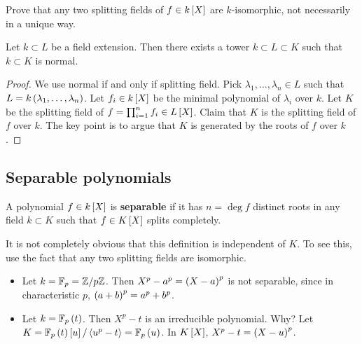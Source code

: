 \begin{exercise*}
Prove that any two splitting fields of $ f \in k\sbr{X} $ are $ k $-isomorphic, not necessarily in a unique way.
\end{exercise*}


\begin{proposition}
Let $ k \subset L $ be a field extension. Then there exists a tower $ k \subset L \subset K $ such that $ k \subset K $ is normal.
\end{proposition}

\begin{proof}
We use normal if and only if splitting field. Pick $ \lambda_1, \dots, \lambda_n \in L $ such that $ L = k\br{\lambda_1, \dots, \lambda_n} $. Let $ f_i \in k\sbr{X} $ be the minimal polynomial of $ \lambda_i $ over $ k $. Let $ K $ be the splitting field of $ f = \prod_{i = 1}^n f_i \in L\sbr{X} $. Claim that $ K $ is the splitting field of $ f $ over $ k $. The key point is to argue that $ K $ is generated by the roots of $ f $ over $ k $.
\end{proof}

\subsection{Separable polynomials}

\begin{definition}
A polynomial $ f \in k\sbr{X} $ is \textbf{separable} if it has $ n = \deg f $ distinct roots in any field $ k \subset K $ such that $ f \in K\sbr{X} $ splits completely.
\end{definition}

\begin{remark*}
It is not completely obvious that this definition is independent of $ K $. To see this, use the fact that any two splitting fields are isomorphic.
\end{remark*}

\begin{example*}
\hfill
\begin{itemize}
\item Let $ k = \mathbb{F}_p = \mathbb{Z} / p\mathbb{Z} $. Then $ X^p - a^p = \br{X - a}^p $ is not separable, since in characteristic $ p $, $ \br{a + b}^p = a^p + b^p $.
\item Let $ k = \FF_p\br{t} $. Then $ X^p - t $ is an irreducible polynomial. Why? Let $ K = \FF_p\br{t}\sbr{u} / \abr{u^p - t} = \FF_p\br{u} $. In $ K\sbr{X} $, $ X^p - t = \br{X - u}^p $.
\end{itemize}
\end{example*}


